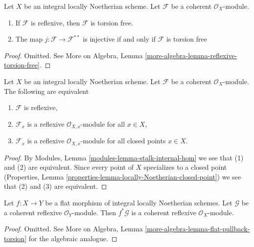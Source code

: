 \begin{lemma}
\label{lemma-reflexive-torsion-free}
Let $X$ be an integral locally Noetherian scheme. Let $\mathcal{F}$
be a coherent $\mathcal{O}_X$-module.
\begin{enumerate}
\item If $\mathcal{F}$ is reflexive, then $\mathcal{F}$ is torsion free.
\item The map $j : \mathcal{F} \longrightarrow \mathcal{F}^{**}$
is injective if and only if $\mathcal{F}$ is torsion free
\end{enumerate}
\end{lemma}

\begin{proof}
Omitted. See More on Algebra, Lemma
\ref{more-algebra-lemma-reflexive-torsion-free}.
\end{proof}

\begin{lemma}
\label{lemma-check-reflexive}
Let $X$ be an integral locally Noetherian scheme.
Let $\mathcal{F}$ be a coherent $\mathcal{O}_X$-module.
The following are equivalent
\begin{enumerate}
\item $\mathcal{F}$ is reflexive,
\item $\mathcal{F}_x$ is a reflexive $\mathcal{O}_{X, x}$-module
for all $x \in X$,
\item $\mathcal{F}_x$ is a reflexive $\mathcal{O}_{X, x}$-module
for all closed points $x \in X$.
\end{enumerate}
\end{lemma}

\begin{proof}
By Modules, Lemma \ref{modules-lemma-stalk-internal-hom} we see that
(1) and (2) are equivalent. Since every point of $X$ specializes to
a closed point
(Properties, Lemma \ref{properties-lemma-locally-Noetherian-closed-point})
we see that (2) and (3) are equivalent.
\end{proof}

\begin{lemma}
\label{lemma-flat-pullback-reflexive}
Let $f : X \to Y$ be a flat morphism of integral locally Noetherian schemes.
Let $\mathcal{G}$ be a coherent reflexive $\mathcal{O}_Y$-module.
Then $f^*\mathcal{G}$ is a coherent reflexive $\mathcal{O}_X$-module.
\end{lemma}

\begin{proof}
Omitted. See
More on Algebra, Lemma \ref{more-algebra-lemma-flat-pullback-torsion}
for the algebraic analogue.
\end{proof}

